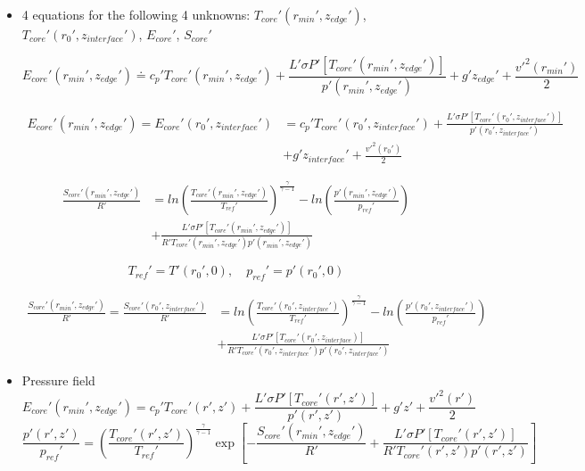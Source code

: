 \documentclass[preprint, prX]{revtex4}
\newcommand{\pfrac}[2]{\left(\frac{#1}{#2}\right)}
\newcommand{\gogmo}{\frac{\gamma}{\gamma-1}}
\newcommand{\rmin}{r_{min}}
\newcommand{\zedge}{z_{edge}}
\newcommand{\zinter}{z_{interface}}
\begin{document}
\begin{itemize}
\item 4 equations for the following 4 unknowns: $T_{core}'(\rmin', \zedge')$, $T_{core}'(r_0', \zinter')$, $E_{core}'$, $S_{core}'$

\begin{equation}
	E_{core}'(\rmin', \zedge') \doteq c_p' T_{core}'(\rmin', \zedge') + \frac{L' \sigma P'[T_{core}'(\rmin', \zedge')]}{p'(\rmin', \zedge')} + g' \zedge' + \frac{v'^2(\rmin')}{2}
\end{equation}

\begin{equation}
\begin{split}
	E_{core}'(\rmin',\zedge') = E_{core}'(r_0', \zinter') &= c_p' T_{core}'(r_0', \zinter') + \frac{L' \sigma P'[ T_{core}'(r_0',\zinter')]}{p'(r_0',\zinter')}\\
	& + g'\zinter' + \frac{v'^2(r_0')}{2}
	\end{split}
\end{equation}

\begin{equation}
\begin{split}
	\frac{S_{core}'(\rmin', \zedge')}{R'} &= ln  \pfrac{T_{core}'(\rmin', \zedge')}{T_{ref}'} ^\gogmo - ln \pfrac{p'(\rmin', \zedge')}{p_{ref}'} \\
	&+ \frac{L' \sigma P'[T_{core}'(\rmin',\zedge')]}{R' T_{core}'(\rmin', \zedge')p'(\rmin', \zedge')}
	\end{split}
\end{equation}

\begin{equation}
	T_{ref}' = T'(r_0',0), \quad p_{ref}' = p'(r_0',0)
\end{equation}

\begin{equation}
\begin{split}
	\frac{S_{core}'(\rmin', \zedge')}{R'} = \frac{S_{core}'(r_0', \zinter')}{R'} &=  ln \pfrac{T_{core}'(r_0', \zinter')}{T_{ref}'} ^\gogmo - ln \pfrac{p'(r_0', \zinter')}{p_{ref}'} \\
	&+ \frac{L' \sigma P'[T_{core}'(r_0', \zinter)]}{R'T_{core}'(r_0', \zinter') p'(r_0', \zinter')}
	\end{split}
\end{equation}

\item Pressure field
\begin{equation}
	E_{core}'(\rmin', \zedge') = c_p' T_{core}'(r',z') + \frac{L' \sigma P'[T_{core}'(r',z')]}{p'(r',z')} + g'z' + \frac{v'^2(r')}{2}
	\label{eq:contour2}
\end{equation}
\begin{equation}
	\frac{p'(r',z')}{p_{ref}'} =  \pfrac{T_{core}'(r',z')}{T_{ref}'}^\gogmo \exp \left[ - \frac{S_{core}'(\rmin', \zedge')}{R'} + \frac{L' \sigma P'[T_{core}'(r',z')]}{R'T_{core}'(r',z')p'(r',z')}\right]
	\label{eq:contour3}
\end{equation}

\end{itemize}
\end{document}
